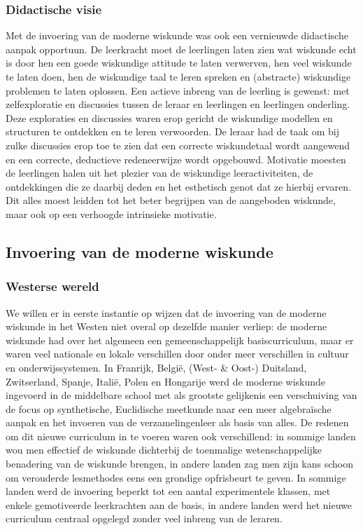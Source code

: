 \documentclass[a4paper,11pt]{article}
\begin{document}
\subsubsection{Didactische visie}\label{did}
Met de invoering van de moderne wiskunde was ook een vernieuwde didactische 
aanpak opportuun. De leerkracht moet de leerlingen laten zien wat wiskunde echt 
is door hen een goede wiskundige attitude te laten verwerven, hen veel wiskunde te 
laten doen, hen de wiskundige taal te leren spreken en (abstracte) wiskundige problemen te 
laten oplossen. Een actieve inbreng van de leerling is gewenst: met 
zelfexploratie en discussies tussen de leraar en leerlingen en leerlingen 
onderling. Deze exploraties en discussies waren erop gericht de wiskundige 
modellen en structuren te ontdekken en te leren verwoorden. De leraar had de taak om 
bij zulke discussies erop toe te zien dat een correcte wiskundetaal wordt aangewend en een 
correcte, deductieve redeneerwijze wordt opgebouwd. Motivatie moesten de 
leerlingen halen uit het plezier van de wiskundige leeractiviteiten, de 
ontdekkingen die ze daarbij deden en het esthetisch genot dat ze hierbij ervaren. 
Dit alles moest leidden tot het beter begrijpen van de aangeboden wiskunde, maar 
ook op een verhoogde intrinsieke motivatie.

\subsection{Invoering van de moderne wiskunde}
\subsubsection{Westerse wereld}
We willen er in eerste instantie op wijzen dat de invoering van de moderne 
wiskunde in het Westen niet overal op dezelfde manier verliep: de moderne 
wiskunde had over het algemeen een gemeenschappelijk basiscurriculum, maar er 
waren veel nationale en lokale verschillen door onder meer verschillen in 
cultuur en onderwijssystemen. In Franrijk, België, (West- \& Oost-) 
Duitsland, Zwitserland, Spanje, Italië, Polen en Hongarije werd de moderne 
wiskunde ingevoerd in de middelbare school met als grootste gelijkenis een 
verschuiving van de focus op synthetische, Euclidische meetkunde naar een meer 
algebraïsche aanpak en het invoeren van de verzamelingenleer als basis van alles. 
De redenen om dit nieuwe curriculum in te voeren waren ook verschillend: in 
sommige landen wou men effectief de wiskunde dichterbij de toenmalige 
wetenschappelijke benadering van de wiskunde brengen, in andere landen zag men 
zijn kans schoon om verouderde lesmethodes eens een grondige opfrisbeurt te 
geven. In sommige landen werd de invoering beperkt tot een aantal experimentele 
klassen, met enkele gemotiveerde leerkrachten aan de basis, in andere landen 
werd het nieuwe curriculum centraal opgelegd zonder veel inbreng van de leraren. 
\\
\end{document}

